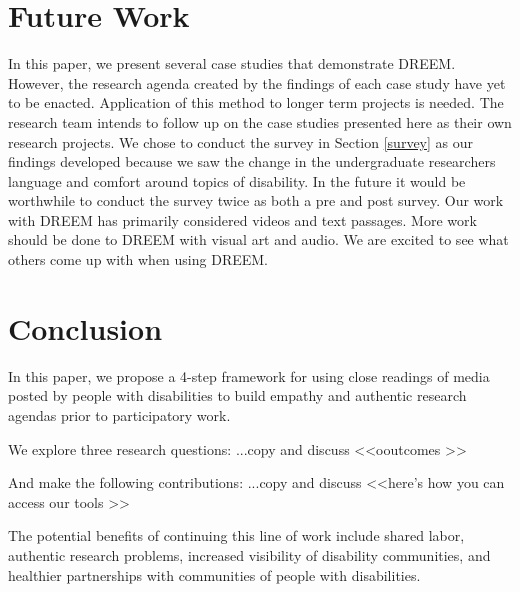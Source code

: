 \section{Future Work}
In this paper, we present several case studies that demonstrate DREEM. However, the research agenda created by the findings of each case study have yet to be enacted. Application of this method to longer term projects is needed. The research team intends to follow up on the case studies presented here as their own research projects. We chose to conduct the survey in Section \ref{survey} as our findings developed because we saw the change in the undergraduate researchers language and comfort around topics of disability. 
In the future it would be worthwhile to conduct the survey twice as both a pre and post survey. Our work with DREEM has primarily considered videos and text passages. More work should be done to DREEM with visual art and audio. We are excited to see what others come up with when using DREEM. 

\section{Conclusion}
In this paper, we propose a 4-step framework for using close readings of media posted by people with disabilities to build empathy and authentic research agendas prior to participatory work. 

We explore three research questions: {\color{red}...copy and discuss} <<ooutcomes >>

And make the following contributions: {\color{red}...copy and discuss} <<here's how you can access our tools >> 

The potential benefits of continuing this line of work include shared labor, authentic research problems, increased visibility of disability communities, and healthier partnerships with communities of people with disabilities. 


